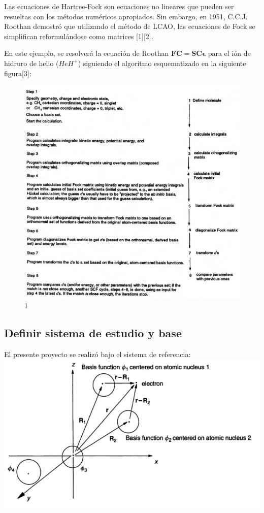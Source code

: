 \documentclass[
  letterpaper,
  DIV=11,
  numbers=noendperiod]{scrreprt}
\begin{document}
Las ecuaciones de Hartree-Fock son ecuaciones no lineares que pueden ser
resueltas con los métodos numéricos apropiados. Sin embargo, en 1951,
C.C.J. Roothan demostró que utilizando el método de LCAO, las ecuaciones
de Fock se simplifican reformulándose como matrices {[}1{]}{[}2{]}.

En este ejemplo, se resolverá la ecuación de Roothan
\(\textbf{F}\textbf{C}=\textbf{S}\textbf{C}\pmb{\epsilon}\) para el ión
de hidruro de helio (\(HeH^{+}\)) siguiendo el algoritmo esquematizado
en la siguiente figura{[}3{]}:

\begin{figure}

{\centering \includegraphics{./images/im22.png}

}

\caption{1}

\end{figure}

\hypertarget{definir-sistema-de-estudio-y-base}{%
\subsection{Definir sistema de estudio y
base}\label{definir-sistema-de-estudio-y-base}}

El presente proyecto se realizó bajo el sistema de referencia:
\includegraphics{./images/im11.png}
\end{document}
